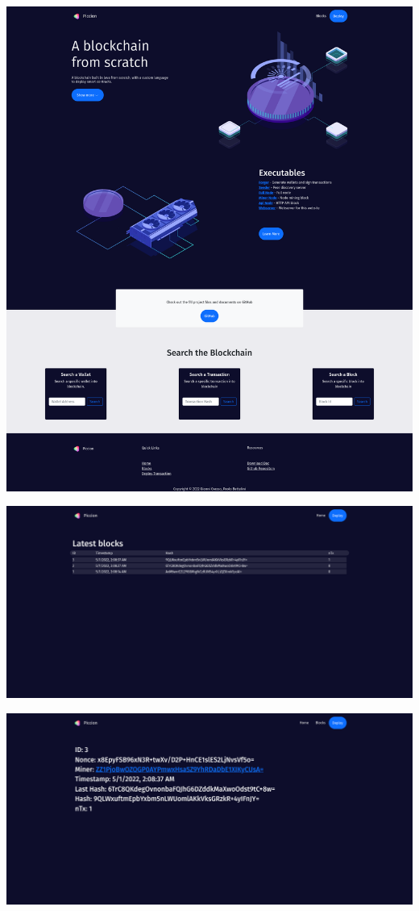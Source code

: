 \documentclass[../documentation.tex]{subfiles}
\begin{document}
\includegraphics[width=\textwidth]{images/website1}


\includegraphics[width=\textwidth]{images/website2}


\includegraphics[width=\textwidth]{images/website3}
\end{document}

